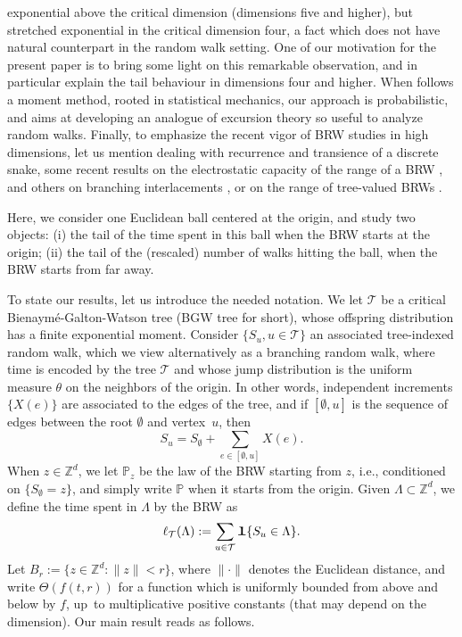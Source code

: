 \documentclass[11pt]{article}
\newcommand{\ie}{i.e.,\xspace}
\numberwithin{equation}{section}
\theoremstyle{plain}
\theoremstyle{definition}
\newcommand\Z{\mathbb{Z}}
\newcommand\T{\mathcal{T}}
\newcommand{\1}{{\text{\Large $\mathfrak 1$}}}
\begin{document}
exponential above the critical dimension (dimensions five and higher), but
stretched exponential in the critical dimension four, a fact which does not have natural counterpart in the random walk setting.
One of our motivation for the present paper
is to bring some light on this remarkable observation, and in particular
explain the tail behaviour in dimensions four and higher.
When \cite{AHJ} follows a moment method, rooted in statistical mechanics,
our approach is probabilistic, and aims at developing an analogue of
excursion theory so useful to analyze random walks. Finally, to
emphasize the recent vigor of BRW studies in high dimensions,
let us mention \cite{BC12,LSS24} dealing with recurrence and transience of a discrete snake, some recent results
on the electrostatic capacity of the range of a BRW \cite{BW20,BH21,BH22},
and others on branching interlacements \cite{PZ19,Zhu18}, or on the range of tree-valued BRWs \cite{DKLT}.

Here, we consider one Euclidean ball centered at the origin, and study
two objects:
(i) the tail of the time spent in this ball when the
BRW starts at the origin;
(ii) the tail of the (rescaled) number of walks hitting the ball,
when the BRW starts from far away.

To state our results, let us introduce the needed notation. We let $\mathbf {\mathcal T}$ be a critical
Bienaymé-Galton-Watson tree (BGW tree for short),
whose offspring distribution has a finite exponential moment.
Consider $\{S_u, u\in \mathbf {\mathcal T}\}$
an associated tree-indexed random walk,
which we view alternatively as a branching random walk, where
time is encoded by the tree $\mathcal T$ and
whose jump distribution is the uniform measure $\theta$ on the neighbors of the origin.
In other words, independent
increments $\{X(e)\}$ are associated to the edges of the tree, and if
$[\emptyset,u]$ is the sequence of edges between the root $\emptyset$ and
vertex~$u$, then
\[
S_u=S_\emptyset+\sum_{e\in [\emptyset,u]}X(e).
\]
When $z\in \Z^d$, we let $\mathbb P_z$ be the law of the BRW
starting from $z$, \ie conditioned on $\{S_\emptyset=z\}$, and simply write $\mathbb P$ when it starts from the origin.
Given $\Lambda\subset \Z^d$, we define the time spent in $\Lambda$ by the BRW as
\begin{equation*}%
\ell_{\T}(\Lambda) := \sum_{u\in \mathcal T}
\1\{S_u \in \Lambda\}.
\end{equation*}
Let $B_r:=\{z\in \Z^d : \|z\|< r\}$, where $\|{\cdot}\|$
denotes the Euclidean distance, and
write $\Theta(f(t,r))$ for a function which is uniformly
bounded from above and below by $f$, up~to
multiplicative positive constants (that may depend on the dimension). Our main result reads as follows.
\end{document}
